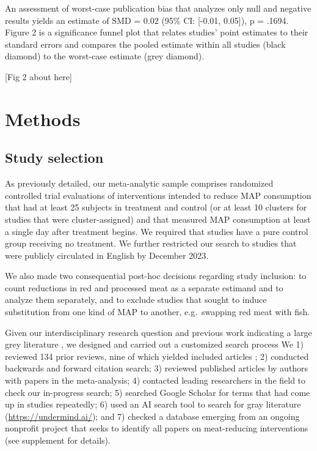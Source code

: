 \documentclass[sn-nature,referee,pdflatex]{sn-jnl}
\begin{document}
An assessment of worst-case publication bias that analyzes only null and
negative results \citep{mathur2024} yields an estimate of SMD = 0.02
(95\% CI: {[}-0.01, 0.05{]}), p = .1694. Figure 2 is a significance
funnel plot \citep{mathur2020} that relates studies' point estimates to
their standard errors and compares the pooled estimate within all
studies (black diamond) to the worst-case estimate (grey diamond).

\begin{center}
[Fig 2 about here]
\end{center}
\begin{comment}
should this be a supplementary fig?
\end{comment}

\section{Methods}\label{sec3}

\subsection{Study selection}\label{sec3.1}

As previously detailed, our meta-analytic sample comprises randomized
controlled trial evaluations of interventions intended to reduce MAP
consumption that had at least 25 subjects in treatment and control (or
at least 10 clusters for studies that were cluster-assigned) and that
measured MAP consumption at least a single day after treatment begins.
We required that studies have a pure control group receiving no
treatment. We further restricted our search to studies that were
publicly circulated in English by December 2023.

We also made two consequential post-hoc decisions regarding study
inclusion: to count reductions in red and processed meat as a separate
estimand and to analyze them separately, and to exclude studies that
sought to induce substitution from one kind of MAP to another,
e.g.~swapping red meat with fish.

Given our interdisciplinary research question and previous work
indicating a large grey literature \citep{mathur2021meta}, we designed
and carried out a customized search process We 1) reviewed 134 prior
reviews, nine of which yielded included articles
\citep{mathur2021meta, bianchi2018conscious, bianchi2018restructuring, ammann2023, chang2023, DiGennaro2024, harguess2020, ronto2022, wynes2018};
2) conducted backwards and forward citation search; 3) reviewed
published articles by authors with papers in the meta-analysis; 4)
contacted leading researchers in the field to check our in-progress
search; 5) searched Google Scholar for terms that had come up in studies
repeatedly; 6) used an AI search tool to search for gray literature
(\url{https://undermind.ai/}); and 7) checked a database emerging from
an ongoing nonprofit project that seeks to identify all papers on
meat-reducing interventions (see supplement for details).
\end{document}
